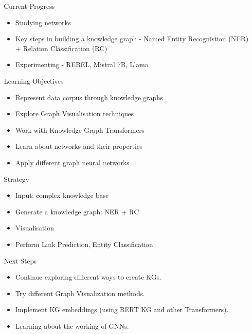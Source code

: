 \documentclass{beamer}
\begin{document}
\begin{frame}{Current Progress}
    \begin{itemize}
        \item Studying networks \cite{course}
        \item Key steps in building a knowledge graph - Named Entity Recognistion (NER) + Relation Classification (RC)
        \item Experimenting - REBEL, Mistral 7B, Llama
    \end{itemize}
\end{frame}

\begin{frame}{Learning Objectives}
    \begin{itemize}
        \item Represent data corpus through knowledge graphs \cite{paper}
        \item Explore Graph Visualisation techniques
        \item Work with Knowledge Graph Transformers
        \item Learn about networks and their properties
        \item Apply different graph neural networks
    \end{itemize}
\end{frame}

\begin{frame}{Strategy}
    \begin{itemize}
        \item Input: complex knowledge base
        \item Generate a knowledge graph: NER + RC 
        \item Visualisation
        \item Perform Link Prediction, Entity Classification
    \end{itemize}
\end{frame}

\begin{frame}{Next Steps}
    \begin{itemize}
        \item Continue exploring different ways to create KGs.
        \item Try different Graph Visualization methods. 
        \item Implement KG embeddings (using BERT KG and other Transformers).
        \item Learning about the working of GNNs.
    \end{itemize}
\end{frame}
\end{document}

